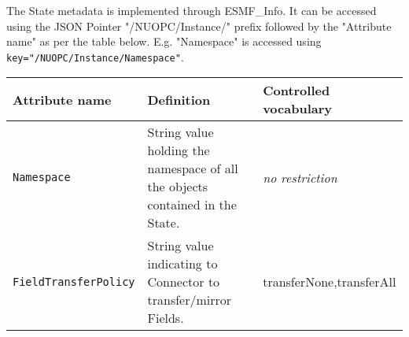 \label{StateMeta}
The State metadata is implemented through ESMF\_Info. It can be accessed
using the JSON Pointer "/NUOPC/Instance/" prefix followed by the "Attribute name"
as per the table below. E.g. "Namespace" is accessed using {\tt key="/NUOPC/Instance/Namespace"}.

\begin{longtable}{|p{}|p{}|p{}|}
     \hline\hline
     {\bf Attribute name} & {\bf Definition} & {\bf Controlled vocabulary}\\
     \hline\hline
     {\tt Namespace}            & String value holding the namespace of all the objects contained in the State.& {\em no restriction}\\ \hline
     {\tt FieldTransferPolicy}  & String value indicating to Connector to transfer/mirror Fields. & transferNone,\newline transferAll\\ \hline
     \hline
\end{longtable}
